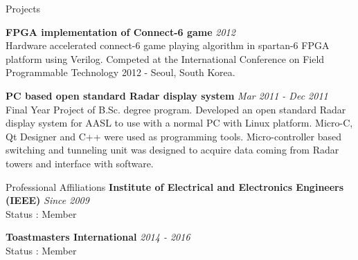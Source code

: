 \documentclass[
11pt, %
]{./../assets/resume} %
\begin{document}
\begin{rSection}{Projects}

	\textbf{FPGA implementation of Connect-6 game} \hfill \textit{2012}\\
	Hardware accelerated connect-6 game playing algorithm in spartan-6 FPGA platform using Verilog. 
	Competed at the International Conference on Field Programmable Technology 2012 - Seoul, South Korea.

	\textbf{PC based open standard Radar display system} \hfill \textit{Mar 2011 - Dec 2011}\\
	Final Year Project of B.Sc. degree program.
	Developed an open standard Radar display system for AASL to use with a normal PC
	with Linux platform. Micro-C, Qt Designer and C++ were used as programming tools.
	Micro-controller based switching and tunneling unit was designed to acquire data coming from Radar towers and interface with software.

\end{rSection}

\begin{rSection}{Professional Affiliations}
	\textbf{Institute of Electrical and Electronics Engineers (IEEE)} \hfill \textit{Since 2009}\\
	Status : Member
	
	
	\textbf{Toastmasters International} \hfill \textit{2014 - 2016}\\
	Status : Member
	
\end{rSection}

\end{document}
